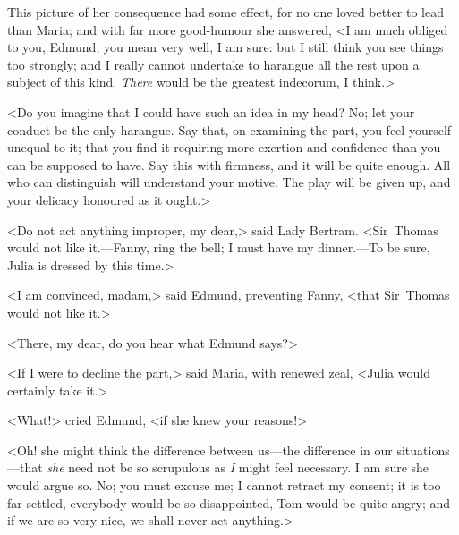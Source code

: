 This picture of her consequence had some effect, for no one loved better to lead than Maria; and with far more good-humour she answered, <I am much obliged to you, Edmund; you mean very well, I am sure: but I still think you see things too strongly; and I really cannot undertake to harangue all the rest upon a subject of this kind. \textit{There}  would be the greatest indecorum, I think.>

<Do you imagine that I could have such an idea in my head? No; let your conduct be the only harangue. Say that, on examining the part, you feel yourself unequal to it; that you find it requiring more exertion and confidence than you can be supposed to have. Say this with firmness, and it will be quite enough. All who can distinguish will understand your motive. The play will be given up, and your delicacy honoured as it ought.>

<Do not act anything improper, my dear,> said Lady Bertram. <Sir~Thomas would not like it.—Fanny, ring the bell; I must have my dinner.—To be sure, Julia is dressed by this time.>

<I am convinced, madam,> said Edmund, preventing Fanny, <that Sir~Thomas would not like it.>

<There, my dear, do you hear what Edmund says?>

<If I were to decline the part,> said Maria, with renewed zeal, <Julia would certainly take it.>

<What!> cried Edmund, <if she knew your reasons!>

<Oh! she might think the difference between us—the difference in our situations—that \textit{she}  need not be so scrupulous as \textit{I}  might feel necessary. I am sure she would argue so. No; you must excuse me; I cannot retract my consent; it is too far settled, everybody would be so disappointed, Tom would be quite angry; and if we are so very nice, we shall never act anything.>

